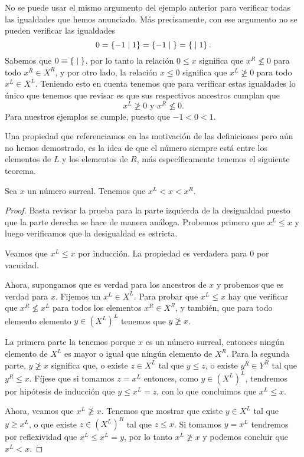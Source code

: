     \begin{example} \label{Ex_equaltozero}
        No se puede usar el mismo argumento del ejemplo anterior para verificar todas las igualdades que hemos anunciado. M\'as precisamente, con ese argumento no se pueden verificar las igualdades
        \[
            0 = \left\{-1\;\middle|\; 1\right\} = \left\{-1\;\middle|\; \right\} = \left\{\;\middle|\; 1\right\}.
        \]
        Sabemos que $0 \equiv \left\{\;\middle|\; \right\}$, por lo tanto la relaci\'on $0 \le x$ significa que $x^R \not\le 0$ para todo $x^R\in X^R$, y por otro lado, la relaci\'on $x\le 0$ significa que $x^L \not\ge 0$ para todo $x^L\in X^L$. Teniendo esto en cuenta tenemos que para verificar estas igualdades lo \'unico que tenemos que revisar es que sus respectivos ancestros cumplan que
        \[
            x^L \not\ge 0\text{ y } x^R \not\le 0.
        \]
        Para nuestros ejemplos se cumple, puesto que $-1 < 0 < 1$. 
    \end{example}

    Una propiedad que referenciamos en las motivaci\'on de las definiciones pero a\'un no hemos demostrado, es la idea de que el n\'umero siempre est\'a entre los elementos de $L$ y los elementos de $R$, m\'as espec\'ificamente tenemos el siguiente teorema.

    \begin{theorem}
        \label{theorem:middle_ancestor}
        Sea $x$ un n\'umero surreal. Tenemos que $x^L < x < x^R$.
    \end{theorem}

    \begin{proof}
        Basta revisar la prueba para la parte izquierda de la desigualdad puesto que la parte derecha se hace de manera an\'aloga. Probemos primero que $x^L \le x$ y luego verificamos que la desigualdad es estricta.

        Veamos que $x^L \le x$ por inducci\'on. La propiedad es verdadera para $0$ por vacuidad. 
        
        Ahora, supongamos que es verdad para los ancestros de $x$ y probemos que es verdad para $x$. Fijemos un $x^L\in X^L$. Para probar que $x^L\le x$ hay que verificar que $x^R \not\le x^L$ para todos los elementos $x^R\in X^R$, y tambi\'en, que para todo elemento elemento $y\in (X^L)^L$ tenemos que $y \not\ge x$.
        
        La primera parte la tenemos porque $x$ es un n\'umero surreal, entonces ning\'un elemento de $X^L$ es mayor o igual que ning\'un elemento de $X^R$. Para la segunda parte, $y \not\ge x$ significa que, o existe $z\in X^L$ tal que $y\le z$, o existe $y^R\in Y^R$ tal que $y^R\le x$. F\'ijese que si tomamos $z = x^L$ entonces, como $y\in (X^L)^L$, tendremos por hip\'otesis de inducci\'on que $y\le x^L = z$, con lo que concluimos que $x^L\le x$.

        Ahora, veamos que $x^L \not\ge x$. Tenemos que mostrar que existe $y\in X^L$ tal que $y\ge x^L$, o que existe $z\in (X^L)^R$ tal que $z\le x$. Si tomamos $y=x^L$ tendremos por reflexividad que $x^L\le x^L = y$, por lo tanto $x^L\not\ge x$ y podemos concluir que $x^L < x$.
    \end{proof}

